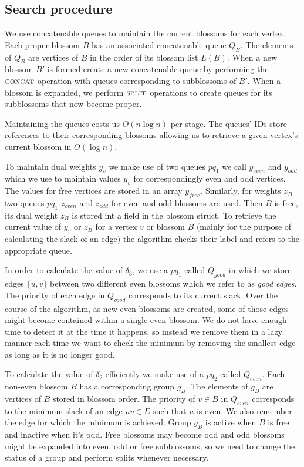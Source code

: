 \subsection{Search procedure}

We use concatenable queues to maintain the current blossoms for each vertex. Each proper blossom $B$ has an associated concatenable queue $Q_B$. The elements of $Q_B$ are vertices of $B$ in the order of its blossom list $L(B)$. When a new blossom $B'$ is formed create a new concatenable queue by performing the $\textsc{concat}$ operation with queues corresponding to subblossoms of $B'$. When a blossom is expanded, we perform $\textsc{split}$ operations to create queues for its subblossoms that now become proper.

Maintaining the queues costs us $O(n\log n)$ per stage. The queues' IDs store references to their corresponding blossoms allowing us to retrieve a given vertex's current blossom in $O(\log n)$.

To maintain dual weights $y_v$ we make use of two queues $pq_1$ we call $y_{even}$ and $y_{odd}$ which we use to maintain values $y_v$ for correspondingly even and odd vertices. The values for free vertices are stored in an array $y_{free}$. Similarly, for weights $z_B$ two queues $pq_1$ $z_{even}$ and $z_{odd}$ for even and odd blossoms are used. Then $B$ is free, its dual weight $z_B$ is stored int a field in the blossom struct. To retrieve the current value of $y_v$ or $z_B$ for a vertex $v$ or blossom $B$ (mainly for the purpose of calculating the slack of an edge) the algorithm checks their label and refers to the appropriate queue.

In order to calculate the value of $\delta_3$, we use a $pq_1$ called $Q_{good}$ in which we store edges $\{u, v\}$ between two different even blossoms which we refer to as \textit{good edges}. The priority of each edge in $Q_{good}$ corresponds to its current slack. Over the course of the algorithm, as new even blossoms are created, some of those edges might become contained within a single even blossom. We do not have enough time to detect it at the time it happens, so instead we remove them in a lazy manner each time we want to check the minimum by removing the smallest edge as long as it is no longer good.

To calculate the value of $\delta_2$ efficiently we make use of a $pq_2$ called $Q_{even}$. Each non-even blossom $B$ has a corresponding group $g_B$. The elements of $g_B$ are vertices of $B$ stored in blossom order. The priority of $v \in B$ in $Q_{even}$ corresponds to the minimum slack of an edge $uv \in E$ such that $u$ is even. We also remember the edge for which the minimum is achieved. Group $g_B$ is active when $B$ is free and inactive when it's odd. Free blossoms may become odd and odd blossoms might be expanded into even, odd or free subblossoms, so we need to change the status of a group and perform splits whenever necessary.

